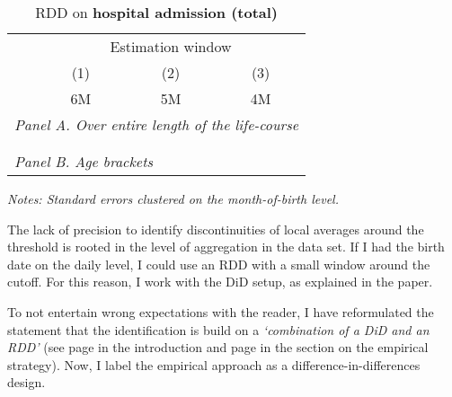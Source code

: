 \begin{table}[H] \centering 
	\begin{threeparttable} \centering \caption{RDD on \textbf{hospital admission (total)}}\label{tab_mlch: revision_RDD_hopsital2_total}
		{\def\sym#1{\ifmmode^{#1}\else\(^{#1}\)\fi} 
			\begin{tabular}{l*{3}{c}}
				\toprule 
				& \multicolumn{3}{c}{Estimation window} \\ 
				\cmidrule(lr){2-4}
				&\multicolumn{1}{c}{(1)}&\multicolumn{1}{c}{(2)}&\multicolumn{1}{c}{(3)}\\
				&\multicolumn{1}{c}{6M}&\multicolumn{1}{c}{5M}&\multicolumn{1}{c}{4M}\\
				\midrule
				\multicolumn{4}{l}{\emph{Panel A. Over entire length of the life-course}} \\
				 \\ \\
				\multicolumn{4}{l}{\emph{Panel B. Age brackets}} \\
				    
				\bottomrule 
		\end{tabular}}
		\begin{tablenotes} 
			\item \scriptsize \emph{Notes: Standard errors clustered on the month-of-birth level.} 
		\end{tablenotes} 
	\end{threeparttable} 
\end{table}

The lack of precision to identify discontinuities of local averages around the threshold is rooted in the level of aggregation in the data set. If I had the birth date on the daily level, I could use an RDD with a small window around the cutoff. For this reason, I work with the DiD setup, as explained in the paper.  


To not entertain wrong expectations with the reader, I have reformulated the statement that the identification is build on a \textit{`combination of a DiD and an RDD'} (see page \pageref{rev_mlch: r1_rdd+did_intro} in the introduction and page \pageref{rev_mlch: r1_rdd+did_em_section} in the section on the empirical strategy). Now, I label the empirical approach as a difference-in-differences design. 


